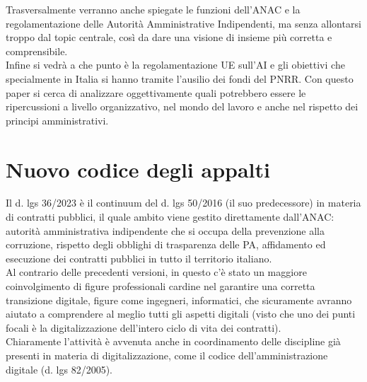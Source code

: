\documentclass{article}
\begin{document}
\begin{justify}
Trasversalmente verranno anche spiegate le funzioni dell'ANAC e la regolamentazione delle Autorità Amministrative Indipendenti, ma senza allontarsi troppo dal topic centrale, così da dare una visione di insieme più corretta e comprensibile.\\
Infine si vedrà a che punto è la regolamentazione UE sull'AI e gli obiettivi che specialmente in Italia si hanno tramite l'ausilio dei fondi del PNRR.
Con questo paper si cerca di analizzare oggettivamente quali potrebbero essere le ripercussioni a livello organizzativo, nel mondo del lavoro e anche nel rispetto dei principi amministrativi.
\end{justify}

\centering
\section{Nuovo codice degli appalti}
\begin{justify}
    Il d. lgs 36/2023 è il continuum del d. lgs 50/2016 (il suo predecessore) in materia di contratti pubblici, il quale ambito viene gestito direttamente dall'ANAC: autorità amministrativa indipendente che si occupa della prevenzione alla corruzione, rispetto degli obblighi di trasparenza delle PA, affidamento ed esecuzione dei contratti pubblici in tutto il territorio italiano.\citep{AnacSite}\\
    Al contrario delle precedenti versioni, in questo c'è stato un maggiore coinvolgimento di figure professionali cardine nel garantire una corretta transizione digitale, figure come ingegneri, informatici, che sicuramente avranno aiutato a comprendere al meglio tutti gli aspetti digitali (visto che uno dei punti focali è la digitalizzazione dell'intero ciclo di vita dei contratti).\\
    Chiaramente l'attività è avvenuta anche in coordinamento delle discipline già presenti in materia di digitalizzazione, come il codice dell'amministrazione digitale (d. lgs 82/2005).
\end{justify}
\end{document}
